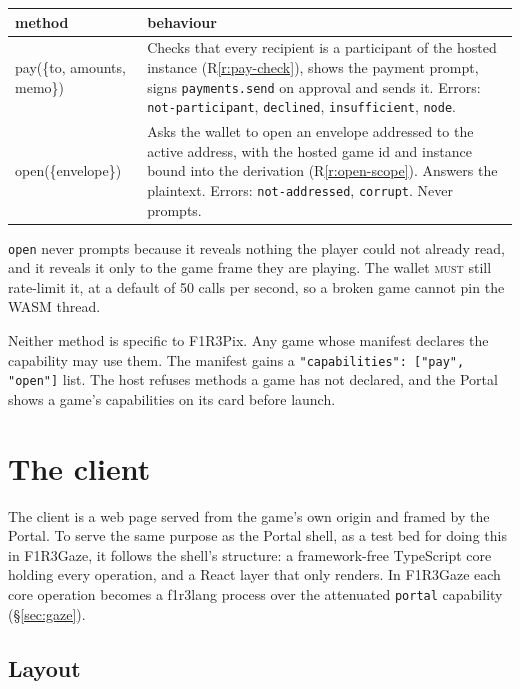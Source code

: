 \documentclass[11pt,a4paper]{article}
\newcommand{\code}[1]{\texttt{#1}}
\newcommand{\MUST}{\textsc{must}}
\begin{document}
\begin{center}\small
\begin{tabularx}{\linewidth}{@{}>{\ttfamily}l X@{}}
\toprule
\normalfont method & behaviour\\
\midrule
pay(\{to, amounts, memo\}) & Checks that every recipient is a participant of the hosted instance (R\ref{r:pay-check}), shows the payment prompt, signs \code{payments.send} on approval and sends it. Errors: \code{not-participant}, \code{declined}, \code{insufficient}, \code{node}.\\
open(\{envelope\}) & Asks the wallet to open an envelope addressed to the active address, with the hosted game id and instance bound into the derivation (R\ref{r:open-scope}). Answers the plaintext. Errors: \code{not-addressed}, \code{corrupt}. Never prompts.\\
\bottomrule
\end{tabularx}
\end{center}

\code{open} never prompts because it reveals nothing the player could not already read, and it
reveals it only to the game frame they are playing. The wallet \MUST{} still rate-limit it, at a
default of 50 calls per second, so a broken game cannot pin the WASM thread.

Neither method is specific to F1R3Pix. Any game whose manifest declares the capability may use
them. The manifest gains a \code{"capabilities": ["pay", "open"]} list. The host refuses
methods a game has not declared, and the Portal shows a game's capabilities on its card before
launch.

\section{The client}\label{sec:client}

The client is a web page served from the game's own origin and framed by the Portal. To serve
the same purpose as the Portal shell, as a test bed for doing this in F1R3Gaze, it follows the
shell's structure: a framework-free TypeScript core holding every operation, and a React layer
that only renders. In F1R3Gaze each core operation becomes a f1r3lang process over the
attenuated \code{portal} capability (\S\ref{sec:gaze}).

\subsection{Layout}
\end{document}
